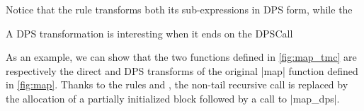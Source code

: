 Notice that the  rule transforms both its sub-expressions in DPS form, while the %

A DPS transformation is interesting when it ends on the DPSCall

\medskip

As an example, we can show that the two \DataLang functions defined in \cref{fig:map_tmc} are respectively the direct and DPS transforms of the original \datalang|map| function defined in \cref{fig:map}.
Thanks to the rules  and , the non-tail recursive call is replaced by the allocation of a partially initialized block followed by a call to \datalang|map_dps|.







